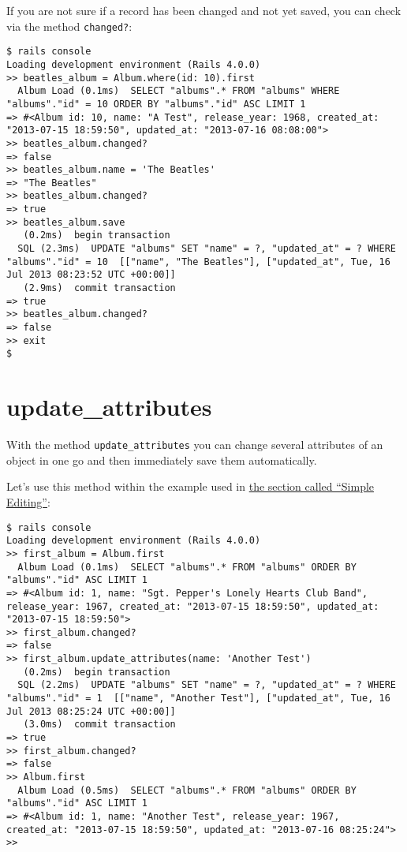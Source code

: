 \documentclass[a4paper]{book}
\begin{document}
If you are not sure if a record has been changed and not yet saved, you can check via the method \texttt{changed?}:

\begin{shaded}\begin{verbatim}
$ rails console
Loading development environment (Rails 4.0.0)
>> beatles_album = Album.where(id: 10).first
  Album Load (0.1ms)  SELECT "albums".* FROM "albums" WHERE "albums"."id" = 10 ORDER BY "albums"."id" ASC LIMIT 1
=> #<Album id: 10, name: "A Test", release_year: 1968, created_at: "2013-07-15 18:59:50", updated_at: "2013-07-16 08:08:00">
>> beatles_album.changed?
=> false
>> beatles_album.name = 'The Beatles'
=> "The Beatles"
>> beatles_album.changed?
=> true
>> beatles_album.save
   (0.2ms)  begin transaction
  SQL (2.3ms)  UPDATE "albums" SET "name" = ?, "updated_at" = ? WHERE "albums"."id" = 10  [["name", "The Beatles"], ["updated_at", Tue, 16 Jul 2013 08:23:52 UTC +00:00]]
   (2.9ms)  commit transaction
=> true
>> beatles_album.changed?
=> false
>> exit
$
\end{verbatim}\end{shaded}

\section{update\_attributes}\label{updateux5fattributes}

With the method \texttt{update\_attributes} you can change several attributes of an object in one go and then immediately save them automatically.

Let's use this method within the example used in \hyperref[activerecordux5feinfachesux5feditieren]{the section called “Simple Editing”}:

\begin{shaded}\begin{verbatim}
$ rails console
Loading development environment (Rails 4.0.0)
>> first_album = Album.first
  Album Load (0.1ms)  SELECT "albums".* FROM "albums" ORDER BY "albums"."id" ASC LIMIT 1
=> #<Album id: 1, name: "Sgt. Pepper's Lonely Hearts Club Band", release_year: 1967, created_at: "2013-07-15 18:59:50", updated_at: "2013-07-15 18:59:50">
>> first_album.changed?
=> false
>> first_album.update_attributes(name: 'Another Test')
   (0.2ms)  begin transaction
  SQL (2.2ms)  UPDATE "albums" SET "name" = ?, "updated_at" = ? WHERE "albums"."id" = 1  [["name", "Another Test"], ["updated_at", Tue, 16 Jul 2013 08:25:24 UTC +00:00]]
   (3.0ms)  commit transaction
=> true
>> first_album.changed?
=> false
>> Album.first
  Album Load (0.5ms)  SELECT "albums".* FROM "albums" ORDER BY "albums"."id" ASC LIMIT 1
=> #<Album id: 1, name: "Another Test", release_year: 1967, created_at: "2013-07-15 18:59:50", updated_at: "2013-07-16 08:25:24">
>>
\end{verbatim}\end{shaded}
\end{document}
